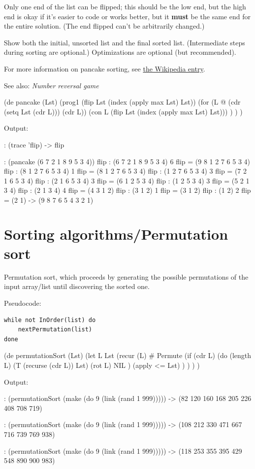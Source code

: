 Only one end of the list can be flipped; this should be the low end, but
the high end is okay if it's easier to code or works better, but it
\textbf{must} be the same end for the entire solution. (The end flipped
can't be arbitrarily changed.)

Show both the initial, unsorted list and the final sorted list.
(Intermediate steps during sorting are optional.) Optimizations are
optional (but recommended).

For more information on pancake sorting, see
\href{http://en.wikipedia.org/wiki/Pancake\_sorting}{the Wikipedia
entry}.

See also: \emph{Number reversal game}


\begin{wideverbatim}

(de pancake (Lst)
   (prog1 (flip Lst (index (apply max Lst) Lst))
      (for (L @  (cdr (setq Lst (cdr L)))  (cdr L))
         (con L (flip Lst (index (apply max Lst) Lst))) ) ) )

Output:

: (trace 'flip)
-> flip

: (pancake (6 7 2 1 8 9 5 3 4))
 flip : (6 7 2 1 8 9 5 3 4) 6
 flip = (9 8 1 2 7 6 5 3 4)
 flip : (8 1 2 7 6 5 3 4) 1
 flip = (8 1 2 7 6 5 3 4)
 flip : (1 2 7 6 5 3 4) 3
 flip = (7 2 1 6 5 3 4)
 flip : (2 1 6 5 3 4) 3
 flip = (6 1 2 5 3 4)
 flip : (1 2 5 3 4) 3
 flip = (5 2 1 3 4)
 flip : (2 1 3 4) 4
 flip = (4 3 1 2)
 flip : (3 1 2) 1
 flip = (3 1 2)
 flip : (1 2) 2
 flip = (2 1)
-> (9 8 7 6 5 4 3 2 1)

\end{wideverbatim}

\pagebreak{}
\section*{Sorting algorithms/Permutation sort}

Permutation sort, which proceeds by generating the possible permutations
of the input array/list until discovering the sorted one.

Pseudocode:

\begin{verbatim}
while not InOrder(list) do
    nextPermutation(list)
done
\end{verbatim}



\begin{wideverbatim}

(de permutationSort (Lst)
   (let L Lst
      (recur (L)  # Permute
         (if (cdr L)
            (do (length L)
               (T (recurse (cdr L)) Lst)
               (rot L)
               NIL )
            (apply <= Lst) ) ) ) )

Output:

: (permutationSort (make (do 9 (link (rand 1 999)))))
-> (82 120 160 168 205 226 408 708 719)

: (permutationSort (make (do 9 (link (rand 1 999)))))
-> (108 212 330 471 667 716 739 769 938)

: (permutationSort (make (do 9 (link (rand 1 999)))))
-> (118 253 355 395 429 548 890 900 983)

\end{wideverbatim}

